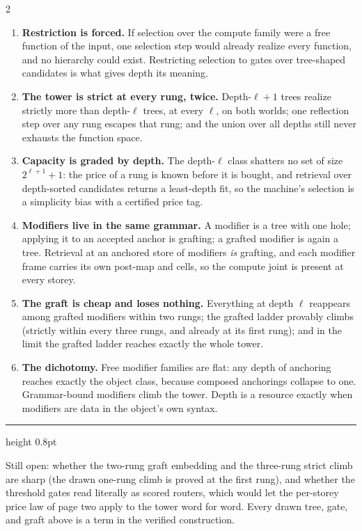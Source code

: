 \documentclass[10pt,a4paper]{article}
\begin{document}
\begin{multicols}{2}
\begin{enumerate}[label=\textbf{W\arabic*.},leftmargin=2.2em,itemsep=0.7pt,parsep=0pt]
\item \textbf{Restriction is forced.} If selection over the compute family were a free function of the input, one selection step would already realize every function, and no hierarchy could exist. Restricting selection to gates over tree-shaped candidates is what gives depth its meaning.
\item \textbf{The tower is strict at every rung, twice.} Depth-$\ell{+}1$ trees realize strictly more than depth-$\ell$ trees, at every $\ell$, on both worlds; one reflection step over any rung escapes that rung; and the union over all depths still never exhausts the function space.
\item \textbf{Capacity is graded by depth.} The depth-$\ell$ class shatters no set of size $2^{\ell+1}{+}1$: the price of a rung is known before it is bought, and retrieval over depth-sorted candidates returns a least-depth fit, so the machine's selection is a simplicity bias with a certified price tag.
\item \textbf{Modifiers live in the same grammar.} A modifier is a tree with one hole; applying it to an accepted anchor is grafting; a grafted modifier is again a tree. Retrieval at an anchored store of modifiers \emph{is} grafting, and each modifier frame carries its own post-map and cells, so the compute joint is present at every storey.
\item \textbf{The graft is cheap and loses nothing.} Everything at depth $\ell$ reappears among grafted modifiers within two rungs; the grafted ladder provably climbs (strictly within every three rungs, and already at its first rung); and in the limit the grafted ladder reaches exactly the whole tower.
\item \textbf{The dichotomy.} Free modifier families are flat: any depth of anchoring reaches exactly the object class, because composed anchorings collapse to one. Grammar-bound modifiers climb the tower. Depth is a resource exactly when modifiers are data in the object's own syntax.
\end{enumerate}
\end{multicols}
\vfill
{\color{ink}\hrule height 0.8pt}
\vspace{2pt}
{\scriptsize\color{grey} Still open: whether the two-rung graft embedding and the three-rung strict climb are sharp (the drawn one-rung climb is proved at the first rung), and whether the threshold gates read literally as scored routers, which would let the per-storey price law of page two apply to the tower word for word. Every drawn tree, gate, and graft above is a term in the verified construction.}
\end{document}
